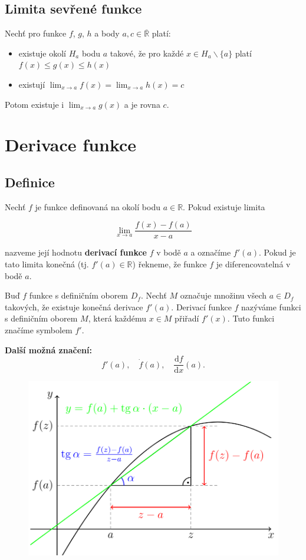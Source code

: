 \documentclass{szzclass}
\begin{document}
\subsection{Limita sevřené funkce}

Nechť pro funkce $f$, $g$, $h$ a body $a, c \in \overline{\mathbb{R}}$ platí:
\begin{itemize}
    \item existuje okolí $H_a$ bodu $a$ takové, že pro každé $x\in H_a\backslash\{a\}$ platí $f(x) \leq g(x) \leq h(x)$
    \item existují $\displaystyle\lim_{x\to a}f(x) = \lim_{x\to a}h(x) = c$
\end{itemize}

Potom existuje i
$\displaystyle\lim_{x\to a} g(x)$
a je rovna $c$.

\newpage

\section{Derivace funkce}

\subsection{Definice}

Nechť $f$ je funkce definovaná na okolí bodu $a\in\mathbb{R}$. Pokud existuje limita


\begin{equation*}
\lim_{x\to a} \frac{f(x) - f(a)}{x-a}\end{equation*}
 
nazveme její hodnotu \textbf{derivací funkce} $f$ v bodě $a$
a označíme $f'(a)$. Pokud je tato limita konečná
(tj. $f'(a) \in \mathbb{R}$) řekneme, že funkce $f$
je diferencovatelná v bodě $a$.

Buď $f$ funkce s definičním oborem $D_f$. Nechť $M$
označuje množinu všech $a\in D_f$ takových, že existuje
konečná derivace $f'(a)$. Derivací funkce $f$ nazýváme
funkci s definičním oborem $M$, která každému $x \in M$
přiřadí $f'(x)$. Tuto funkci značíme symbolem $f'$.

\textbf{Další možná značení:}
\begin{equation*}
f'(a), \quad \dot{f}(a), \quad \frac{\mathrm{d}f}{\mathrm{d}x}(a).\end{equation*}

\begin{figure}[h]
    \includegraphics[width=.6\textwidth, center]{topics/bi-spol-34/images/tecna.png}
\end{figure}
\end{document}
